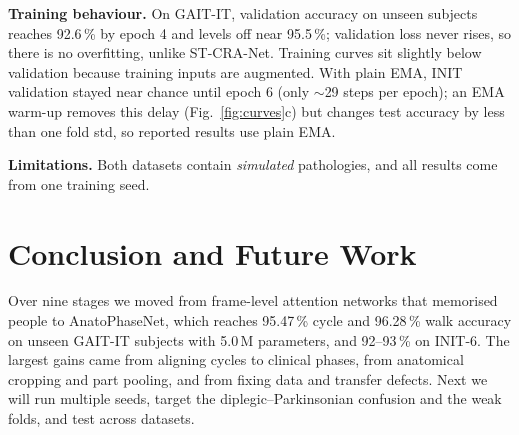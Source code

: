 \documentclass[conference]{IEEEtran}
\begin{document}
\textbf{Training behaviour.} On GAIT-IT, validation accuracy on unseen
subjects reaches 92.6\,\% by epoch 4 and levels off near 95.5\,\%; validation
loss never rises, so there is no overfitting, unlike ST-CRA-Net. Training curves
sit slightly below validation because training inputs are augmented. With plain
EMA, INIT validation stayed near chance until epoch 6 (only $\sim$29 steps per
epoch); an EMA warm-up removes this delay (Fig.~\ref{fig:curves}c) but changes
test accuracy by less than one fold std, so reported results use plain EMA.

\textbf{Limitations.} Both datasets contain \emph{simulated} pathologies, and
all results come from one training seed.

\section{Conclusion and Future Work}
Over nine stages we moved from frame-level attention networks that memorised
people to AnatoPhaseNet, which reaches 95.47\,\% cycle and 96.28\,\% walk
accuracy on unseen GAIT-IT subjects with 5.0\,M parameters, and 92--93\,\% on
INIT-6. The largest gains came from aligning cycles to clinical phases, from
anatomical cropping and part pooling, and from fixing data and transfer
defects. Next we will run multiple seeds, target the diplegic--Parkinsonian
confusion and the weak folds, and test across datasets.
\end{document}
